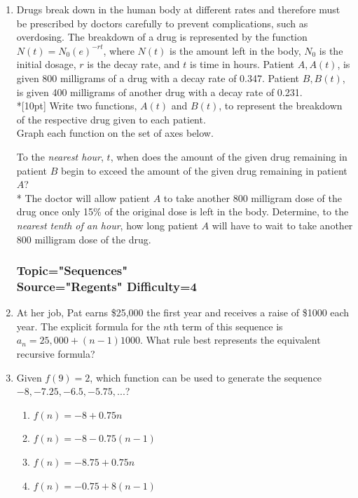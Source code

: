 \documentclass[12pt, oneside]{article}
\begin{document}
\begin{enumerate}
\newpage
\item Drugs break down in the human body at different rates and therefore must be prescribed by doctors carefully to prevent complications, such as overdosing. The breakdown of a drug is represented by the function $N(t)=N_0(e)^{-rt}$, where $N(t)$ is the amount left in the body, $N_0$ is the initial dosage, $r$ is the decay rate, and $t$ is time in hours. Patient $A, A(t)$, is given 800 milligrams of a drug with a decay rate of 0.347. Patient $B, B(t)$, is given 400 milligrams of another drug with a decay rate of 0.231.\\*[10pt]
Write two functions, $A(t)$ and $B(t)$, to represent the breakdown of the respective drug given to each patient.\\[1in]
Graph each function on the set of axes below.
\begin{center}
\end{center}
To the \emph{nearest hour}, $t$, when does the amount of the given drug remaining in patient $B$ begin to exceed the amount of the given drug remaining in patient $A$?\\*%
The doctor will allow patient $A$ to take another 800 milligram dose of the drug once only 15\% of the original dose is left in the body. Determine, to the \emph{nearest tenth of an hour}, how long patient $A$ will have to wait to take another 800 milligram dose of the drug. %
\newpage

\subsubsection*{Topic="Sequences"\\
Source="Regents" 
Difficulty=4}

\item At her job, Pat earns \$25,000 the first year and receives a raise of \$1000 each year. The explicit formula for the $n$th term of this sequence is $a_n = 25,000 + (n - 1)1000$. What rule best represents the equivalent recursive formula?

\item Given $f(9)=2$, which function can be used to generate the sequence  $-8, -7.25, -6.5, -5.75,...$?
\begin{enumerate}
    \item $f(n)=-8+0.75n$
    \item $f(n)=-8-0.75(n-1)$
    \item $f(n)=-8.75+0.75n$
    \item $f(n)=-0.75+8(n-1)$
\end{enumerate} %


\end{enumerate}
\end{document}
